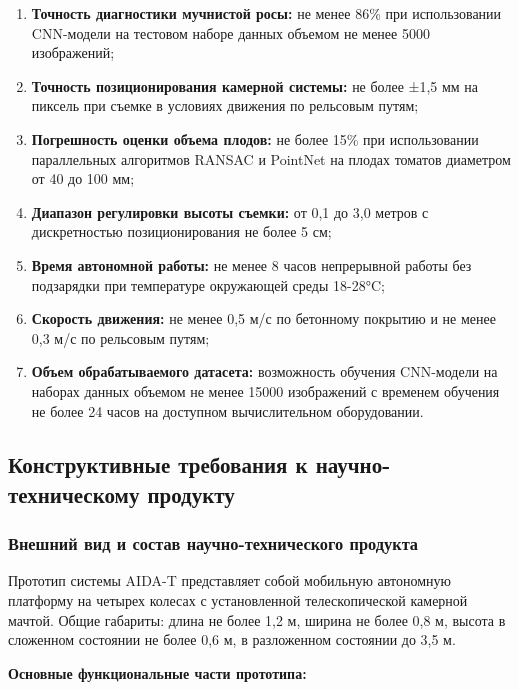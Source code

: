 \documentclass[12pt,a4paper]{article}
\begin{document}
\begin{enumerate}
\item \textbf{Точность диагностики мучнистой росы:} не менее 86\% при использовании CNN-модели на тестовом наборе данных объемом не менее 5000 изображений;

\item \textbf{Точность позиционирования камерной системы:} не более ±1,5 мм на пиксель при съемке в условиях движения по рельсовым путям;

\item \textbf{Погрешность оценки объема плодов:} не более 15\% при использовании параллельных алгоритмов RANSAC и PointNet на плодах томатов диаметром от 40 до 100 мм;

\item \textbf{Диапазон регулировки высоты съемки:} от 0,1 до 3,0 метров с дискретностью позиционирования не более 5 см;

\item \textbf{Время автономной работы:} не менее 8 часов непрерывной работы без подзарядки при температуре окружающей среды 18-28°C;

\item \textbf{Скорость движения:} не менее 0,5 м/с по бетонному покрытию и не менее 0,3 м/с по рельсовым путям;

\item \textbf{Объем обрабатываемого датасета:} возможность обучения CNN-модели на наборах данных объемом не менее 15000 изображений с временем обучения не более 24 часов на доступном вычислительном оборудовании.
\end{enumerate}

\subsection{Конструктивные требования к научно-техническому продукту}

\subsubsection{Внешний вид и состав научно-технического продукта}

Прототип системы AIDA-T представляет собой мобильную автономную платформу на четырех колесах с установленной телескопической камерной мачтой. Общие габариты: длина не более 1,2 м, ширина не более 0,8 м, высота в сложенном состоянии не более 0,6 м, в разложенном состоянии до 3,5 м.

\textbf{Основные функциональные части прототипа:}
\end{document}
